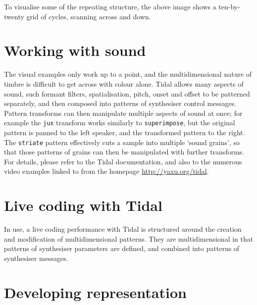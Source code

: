 \documentclass[authoryear,preprint]{sigplanconf}
\begin{document}
To visualise some of the repeating structure, the above image shows a
ten-by-twenty grid of cycles, scanning across and down.

\section{Working with sound}

The visual examples only work up to a point, and the multidimensional
nature of timbre is difficult to get across with colour alone. Tidal
allows many aspects of sound, such formant filters, spatialisation,
pitch, onset and offset to be patterned separately, and then composed
into patterns of synthesiser control messages. Pattern transforms can
then manipulate multiple aspects of sound at once; for example the
\lstinline{jux} transform works similarly to \lstinline{superimpose},
but the original pattern is panned to the left speaker, and the
transformed pattern to the right. The \lstinline{striate} pattern
effectively cuts a sample into multiple `sound grains', so that those
patterns of grains can then be manipulated with further
transforms. For details, please refer to the Tidal documentation, and
also to the numerous video examples linked to from the homepage
\url{http://yaxu.org/tidal}.

\section{Live coding with Tidal}


In use, a live coding performance with Tidal is structured around the
creation and modification of multidimensional patterns. They are
multidimensional in that patterns of synthesiser parameters are defined,
and combined into patterns of synthesiser messages.


\section{Developing representation}
\label{tidaldev}
\end{document}

